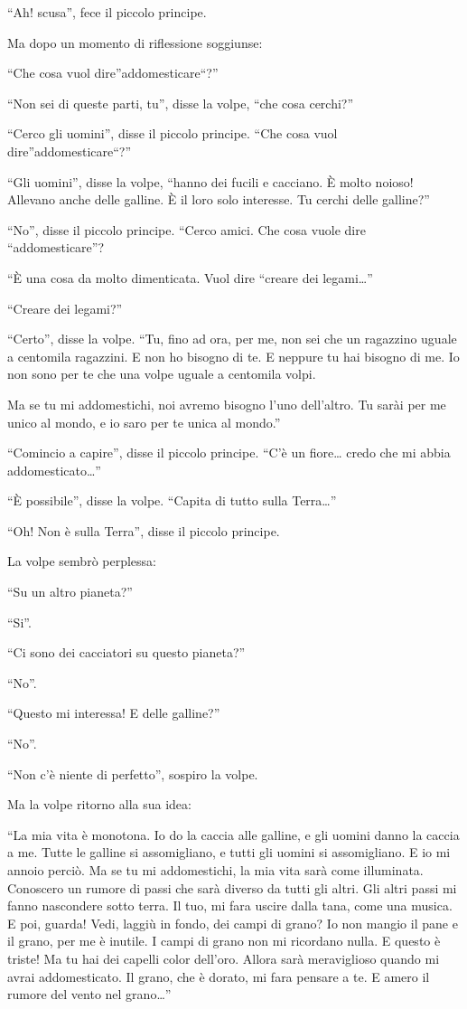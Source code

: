 \documentclass[11pt]{scrbook}
\begin{document}
``Ah! scusa'', fece il piccolo principe.

Ma dopo un momento di riflessione soggiunse:

``Che cosa vuol dire''addomesticare``?''

``Non sei di queste parti, tu'', disse la volpe, ``che cosa cerchi?''

``Cerco gli uomini'', disse il piccolo principe. ``Che cosa vuol dire''addomesticare``?''

``Gli uomini'', disse la volpe, ``hanno dei fucili e cacciano. È molto noioso! Allevano anche delle galline. È il loro solo interesse. Tu cerchi delle galline?''

``No'', disse il piccolo principe. ``Cerco amici. Che cosa vuole dire ``addomesticare''?

``È una cosa da molto dimenticata. Vuol dire ``creare dei legami\ldots{}''

``Creare dei legami?''

``Certo'', disse la volpe. ``Tu, fino ad ora, per me, non sei che un ragazzino uguale a centomila ragazzini. E non ho bisogno di te. E neppure tu hai bisogno di me. Io non sono per te che una volpe uguale a centomila volpi.

Ma se tu mi addomestichi, noi avremo bisogno l'uno dell'altro. Tu sarài per me unico al mondo, e io saro per te unica al mondo.''

``Comincio a capire'', disse il piccolo principe. ``C'è un fiore\ldots{} credo che mi abbia addomesticato\ldots{}''

``È possibile'', disse la volpe. ``Capita di tutto sulla Terra\ldots{}''

``Oh! Non è sulla Terra'', disse il piccolo principe.

La volpe sembrò perplessa:

``Su un altro pianeta?''

``Si''.

``Ci sono dei cacciatori su questo pianeta?''

``No''.

``Questo mi interessa! E delle galline?''

``No''.

``Non c'è niente di perfetto'', sospiro la volpe.

Ma la volpe ritorno alla sua idea:

``La mia vita è monotona. Io do la caccia alle galline, e gli uomini danno la caccia a me. Tutte le galline si assomigliano, e tutti gli uomini si assomigliano. E io mi annoio perciò. Ma se tu mi addomestichi, la mia vita sarà come illuminata. Conoscero un rumore di passi che sarà diverso da tutti gli altri. Gli altri passi mi fanno nascondere sotto terra. Il tuo, mi fara uscire dalla tana, come una musica. E poi, guarda! Vedi, laggiù in fondo, dei campi di grano? Io non mangio il pane e il grano, per me è inutile. I campi di grano non mi ricordano nulla. E questo è triste! Ma tu hai dei capelli color dell'oro. Allora sarà meraviglioso quando mi avrai addomesticato. Il grano, che è dorato, mi fara pensare a te. E amero il rumore del vento nel grano\ldots{}''
\end{document}
